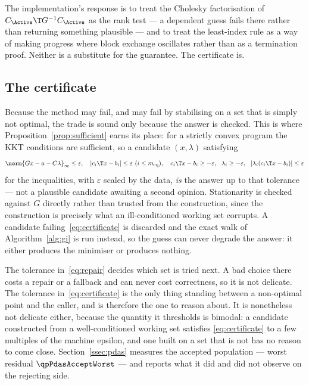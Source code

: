 The implementation's response is to treat the Cholesky factorisation of
$C_\Active\T G^{-1}C_\Active$ as the rank test --- a dependent guess fails there
rather than returning something plausible --- and to treat the least-index rule as
a way of making progress where block exchange oscillates rather than as a
termination proof. Neither is a substitute for the guarantee. The certificate is.

\subsection{The certificate}

Because the method may fail, and may fail by stabilising on a set that is simply
not optimal, the trade is sound only because the answer is checked. This is where
Proposition~\ref{prop:sufficient} earns its place: for a strictly convex program
the KKT conditions are sufficient, so a candidate $(x,\lambda)$ satisfying
\begin{equation}
  \norm{G x - a - C\lambda}_\infty \le \varepsilon,
  \quad
  |c_i\T x - b_i| \le \varepsilon \ (i \le m_{\mathrm{eq}}),
  \quad
  c_i\T x - b_i \ge -\varepsilon, \ \ \lambda_i \ge -\varepsilon,
  \ \ |\lambda_i (c_i\T x - b_i)| \le \varepsilon
  \label{eq:certificate}
\end{equation}
for the inequalities, with $\varepsilon$ scaled by the data, \emph{is} the answer
up to that tolerance --- not a plausible candidate awaiting a second opinion.
Stationarity is checked against $G$ directly rather than trusted from the
construction, since the construction is precisely what an ill-conditioned working
set corrupts. A candidate failing~\eqref{eq:certificate} is discarded and the
exact walk of Algorithm~\ref{alg:gi} is run instead, so the guess can never
degrade the answer: it either produces the minimiser or produces nothing.

\begin{remark}
The tolerance in~\eqref{eq:repair} decides which set is tried next. A bad choice
there costs a repair or a fallback and can never cost correctness, so it is not
delicate. The tolerance in~\eqref{eq:certificate} is the only thing standing
between a non-optimal point and the caller, and is therefore the one to reason
about. It is nonetheless not delicate either, because the quantity it thresholds
is bimodal: a candidate constructed from a well-conditioned working set satisfies
\eqref{eq:certificate} to a few multiples of the machine epsilon, and one built on
a set that is not has no reason to come close. Section~\ref{ssec:pdas} measures
the accepted population --- worst residual $\qpPdasAcceptWorst$ --- and reports
what it did and did not observe on the rejecting side.
\end{remark}

